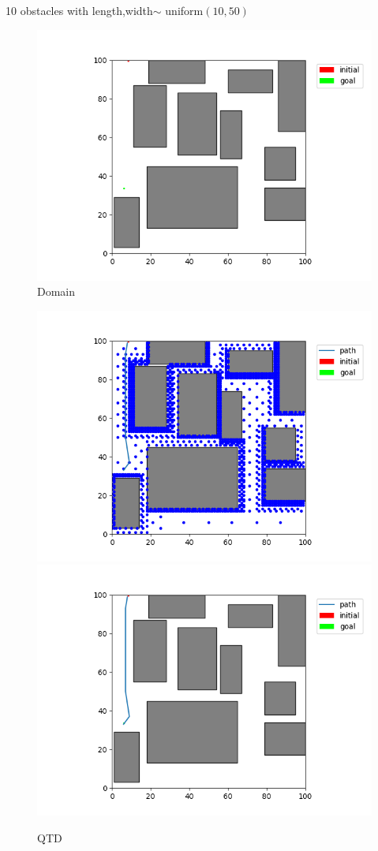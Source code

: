 \documentclass[12pt,a4paper]{article}
\begin{document}
10 obstacles with length,width$\sim$ uniform$(10,50)$\\
\begin{figure}[H]
\centering
	\includegraphics[scale=.40]{10_50_emp}
\caption{Domain}
\end{figure}

\begin{figure}[H]
\centering
	\includegraphics[scale=.40]{10_50_qtd_state}
    \includegraphics[scale=.40]{10_50_qtd_path}
\caption{QTD}
\end{figure}
\end{document}
